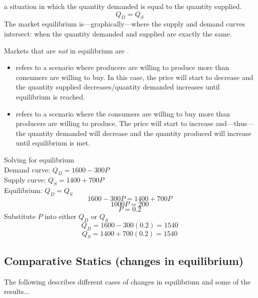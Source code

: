 \documentclass{article}
\begin{document}
\begin{definition}
  a situation in which the quantity demanded is equal to the quantity supplied. $$Q_{D}=Q_{S}$$ The market equilibrium is---graphically---where the supply and demand curves intersect: when the quantity demanded and supplied are exactly the same. 
\end{definition}

Markets that are \emph{not} in equilibrium are . 
\begin{itemize}
  \item {} refers to a scenario where producers are willing to produce more than consumers are willing to buy. In this case, the price will start to decrease and the quantity supplied decreases/quantity demanded increases until equilibrium is reached. 
  \item {} refers to a scenario where the consumers are willing to buy more than producers are willing to produce. The price will start to increase and---thus---the quantity demanded will decrease and the quantity produced will increase until equilibrium is met. 
\end{itemize}

\begin{example}{Solving for equilibrium}
  \\ Demand curve: $Q_D = 1600 - 300P$
  \\ Supply curve: $Q_S = 1400 + 700P$  \\ 
  Equilibrium: $Q_D = Q_S$ 
  $$1600-300P=1400+700P$$
  $$1000P=200$$
  $$P=0.2$$
  Substitute $P$ into either $Q_D$ or $Q_S$ 
  $$Q_D = 1600-300(0.2) = 1540$$ 
  $$Q_S = 1400+700(0.2) = 1540$$
\end{example}

\subsection{Comparative Statics (changes in equilibrium)} 

The following describes different cases of changes in equilibrium and some of the results$\dots$ 
\end{document}
